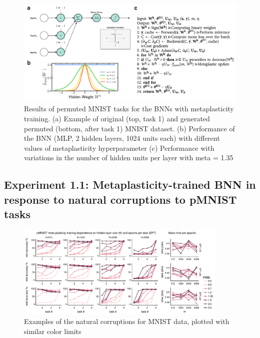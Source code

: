 \documentclass[manuscript,screen,review]{acmart}
\begin{document}
\begin{figure}[h]
    \centering
    \includegraphics[width=\textwidth]{figures/report/Fig1.pdf}
    \caption{Results of permuted MNIST tasks for the BNNs with metaplasticity training. (a) Example of original (top, task 1) and generated permuted (bottom, after task 1) MNIST dataset. (b) Performance of the BNN (MLP, 2 hidden layers, 1024 units each) with different values of metaplasticity hyperparameter (c) Performance with variations in the number of hidden units per layer with meta = 1.35}
    \label{fig:fig1}
\end{figure}

\subsection{Experiment 1.1: Metaplasticity-trained BNN in response to natural corruptions to pMNIST tasks 
}

\begin{figure}[ht]
    \centering
    \includegraphics[width=0.9\textwidth]{figures/report/Fig2.pdf}
    \caption{Examples of the natural corruptions for MNIST data, plotted with similar color limits}
    \label{fig:fig2}
\end{figure}
\end{document}
